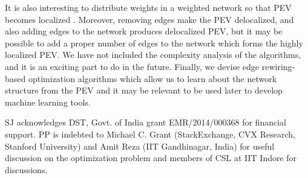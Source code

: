 \documentclass[envcountreset,oribibl]{llncs}
\begin{document}
It is also interesting to distribute weights in a weighted network so that PEV becomes localized \cite{Goltsev_prl2012}. Moreover, removing edges make the PEV delocalized, and also adding edges to the network produces delocalized PEV, but it may be possible to add a proper number of edges to the network which forms the highly localized PEV. We have not included the complexity analysis of the algorithms, and it is an exciting part to do in the future. Finally, we devise edge rewiring-based optimization algorithms which allow us to learn about the network structure from the PEV and it may be relevant to be used later to develop machine learning tools.

 SJ acknowledges DST, Govt. of India grant EMR/2014/000368 for financial support. PP is indebted to Michael C. Grant (StackExchange, CVX Research, Stanford University) and Amit Reza (IIT Gandhinagar, India) for useful discussion on the optimization problem and members of CSL at IIT Indore for discussions. 
\end{document}
